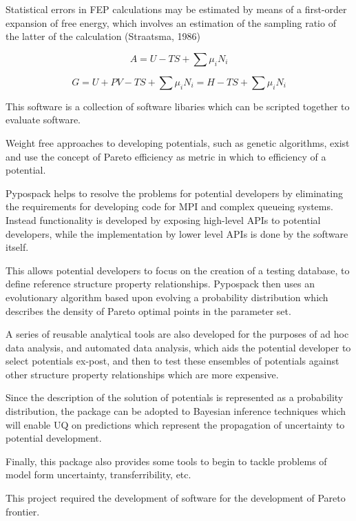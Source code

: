 Statistical errors in FEP calculations may be estimated by means of a first-order expansion of free energy, which involves an estimation of the sampling ratio of the latter of the calculation (Straatsma, 1986)

\begin{equation}\label{eq:helmoholtz_free_energy}
  A = U-TS + \sum \mu_i N_i
\end{equation}

\begin{equation}\label{eq:gibbs_free_energy}
  G = U+PV-TS + \sum \mu_i N_i = H - TS + \sum \mu_i N_i
\end{equation}

This software is a collection of software libaries which can be scripted together to evaluate software.

Weight free approaches to developing potentials, such as genetic algorithms, exist and use the concept of Pareto efficiency as metric in which to efficiency of a potential.

Pypospack helps to resolve the problems for potential developers by eliminating the requirements for developing code for MPI and complex queueing systems.  Instead functionality is developed by exposing high-level APIs to potential developers, while the implementation by lower level APIs is done by the software itself.

This allows potential developers to focus on the creation of a testing database, to define reference structure property relationships.  Pypospack then uses an evolutionary algorithm based upon evolving a probability distribution which describes the density of Pareto optimal points in the parameter set.

A series of reusable analytical tools are also developed for the purposes of ad hoc data analysis, and automated data analysis, which aids the potential developer to select potentials ex-post, and then to test these ensembles of potentials against other structure property relationships which are more expensive.

Since the description of the solution of potentials is represented as a probability distribution, the package can be adopted to Bayesian inference techniques which will enable UQ on predictions which represent the propagation of uncertainty to potential development.

Finally, this package also provides some tools to begin to tackle problems of model form uncertainty, transferribility, etc.

This project required the development of software for the development of Pareto frontier.


